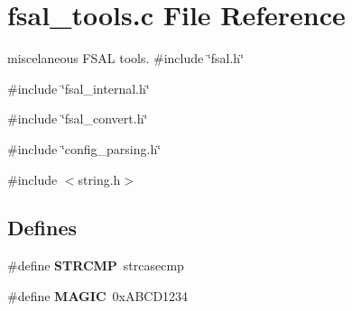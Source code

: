 \section{fsal\_\-tools.c File Reference}
\label{fsal__tools_8c}


miscelaneous FSAL tools.  
{\ttfamily \#include \char`\"{}fsal.h\char`\"{}}\par
{\ttfamily \#include \char`\"{}fsal\_\-internal.h\char`\"{}}\par
{\ttfamily \#include \char`\"{}fsal\_\-convert.h\char`\"{}}\par
{\ttfamily \#include \char`\"{}config\_\-parsing.h\char`\"{}}\par
{\ttfamily \#include $<$string.h$>$}\par
\subsection*{Defines}
\begin{DoxyCompactItemize}
\item 
\#define {\bfseries STRCMP}~strcasecmp\label{fsal__tools_8c_a1ffef5879101d778f17a377e0d8b0e00}

\item 
\#define {\bfseries MAGIC}~0xABCD1234\label{fsal__tools_8c_a94630370ae389fb1189282fa0742f310}

\end{DoxyCompactItemize}
